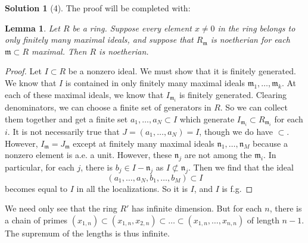 \documentclass{article}
\newtheorem{lemma}{Lemma}
\theoremstyle{definition}
\newtheorem*{solution}{Solution}
\begin{document}
\begin{solution}[4]
The proof will be completed with:
\begin{lemma} 
Let $R$ be a ring. Suppose every element $x \neq 0$ in the ring belongs to only
finitely many maximal ideals, and suppose that $R_{\mathfrak{m}}$ is noetherian
for each $\mathfrak{m} \subset R$ maximal. Then $R$ is noetherian. 
\end{lemma} 
\begin{proof} 
Let $I \subset R$ be a nonzero ideal. We must show that it is finitely generated. We
know that $I$ is contained in only finitely many maximal ideals $\mathfrak{m}_1
, \dots , \mathfrak{m}_k$. 
At each of these maximal ideals, we know that $I_{\mathfrak{m}_i}$ is finitely
generated. Clearing denominators, we can choose a finite set of generators in
$R$. So we can collect them together and get a finite set $a_1, \dots, a_N
\subset I$
which generate $I_{\mathfrak{m}_i} \subset R_{\mathfrak{m}_i}$ for each $i$. It
is not necessarily true that $J = (a_1, \dots, a_N) = I$, though we do have
$\subset$. However, $I_{\mathfrak{m}} = J_{\mathfrak{m}}$ except at finitely
many maximal ideals $\mathfrak{n}_1, \dots, \mathfrak{n}_M$ because a nonzero
element is a.e. a unit. However, these $\mathfrak{n}_j$ are not among the
$\mathfrak{m}_i$. In particular, for each $j$, there is $b_j \in I -
\mathfrak{n}_j$ as $I \not\subset \mathfrak{n}_j$. Then we find that the ideal
\[ (a_1, \dots, a_N, b_1, \dots, b_M) \subset I \]
becomes equal to $I$ in all the localizations. So it is $I$, and $I$ is f.g. 

\end{proof} 

We need only see that the ring $R'$ has infinite dimension. But for each $n$, there
is a chain of primes $(x_{1,n}) \subset (x_{1,n}, x_{2,n}) \subset
\dots \subset (x_{1,n}, \dots, x_{n,n})$ of length $n-1$. The supremum of the
lengths is thus infinite.

\end{solution}
\end{document}
